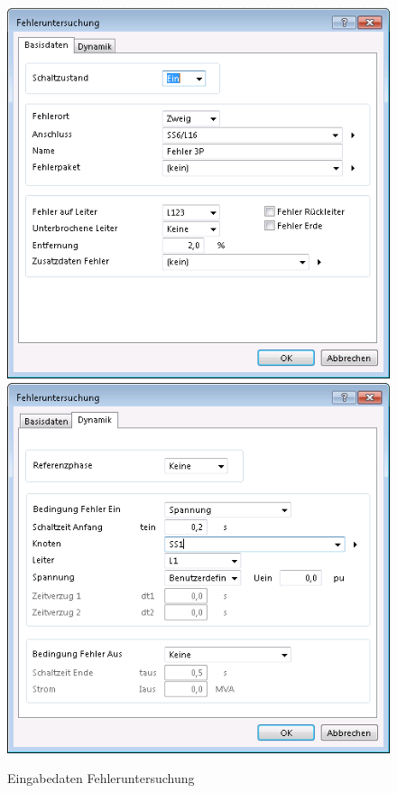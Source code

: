 \documentclass{scrartcl}
\begin{document}
\begin{onehalfspace}
	\begin{figure}[H]
	\centering
	\includegraphics[scale=0.4]{img/fehleruntersuchung-basis.png}
	\includegraphics[scale=0.4]{img/fehleruntersuchung-dyn.png}
	\caption{Eingabedaten Fehleruntersuchung}
	\end{figure}


\end{onehalfspace}
\end{document}
